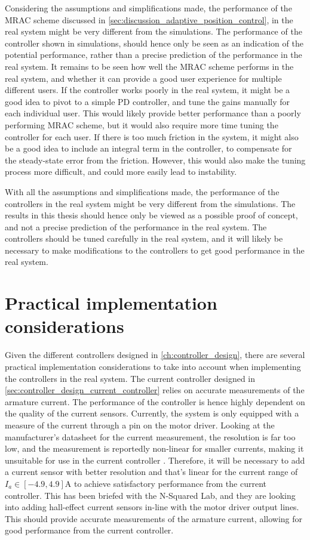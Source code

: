 Considering the assumptions and simplifications made, the performance of the MRAC scheme discussed in \cref{sec:discussion_adaptive_position_control}, in the real system might be very different from the simulations. The performance of the controller shown in simulations, should hence only be seen as an indication of the potential performance, rather than a precise prediction of the performance in the real system. It remains to be seen how well the MRAC scheme performs in the real system, and whether it can provide a good user experience for multiple different users. If the controller works poorly in the real system, it might be a good idea to pivot to a simple PD controller, and tune the gains manually for each individual user. This would likely provide better performance than a poorly performing MRAC scheme, but it would also require more time tuning the controller for each user. If there is too much friction in the system, it might also be a good idea to include an integral term in the controller, to compensate for the steady-state error from the friction. However, this would also make the tuning process more difficult, and could more easily lead to instability.

With all the assumptions and simplifications made, the performance of the controllers in the real system might be very different from the simulations. The results in this thesis should hence only be viewed as a possible proof of concept, and not a precise prediction of the performance in the real system. The controllers should be tuned carefully in the real system, and it will likely be necessary to make modifications to the controllers to get good performance in the real system.

\section{Practical implementation considerations}%
\label{sec:discussion_practical_implementation}

Given the different controllers designed in \cref{ch:controller_design}, there are several practical implementation considerations to take into account when implementing the controllers in the real system. The current controller designed in \cref{sec:controller_design_current_controller} relies on accurate measurements of the armature current. The performance of the controller is hence highly dependent on the quality of the current sensors. Currently, the system is only equipped with a measure of the current through a pin on the motor driver. Looking at the manufacturer's datasheet for the current measurement, the resolution is far too low, and the measurement is reportedly non-linear for smaller currents, making it unsuitable for use in the current controller \parencite{PololuDualMC33926}. Therefore, it will be necessary to add a current sensor with better resolution and that's linear for the current range of $I_a \in [-4.9, 4.9]\si{\ampere}$ to achieve satisfactory performance from the current controller. This has been briefed with the N-Squared Lab, and they are looking into adding hall-effect current sensors in-line with the motor driver output lines. This should provide accurate measurements of the armature current, allowing for good performance from the current controller. 

